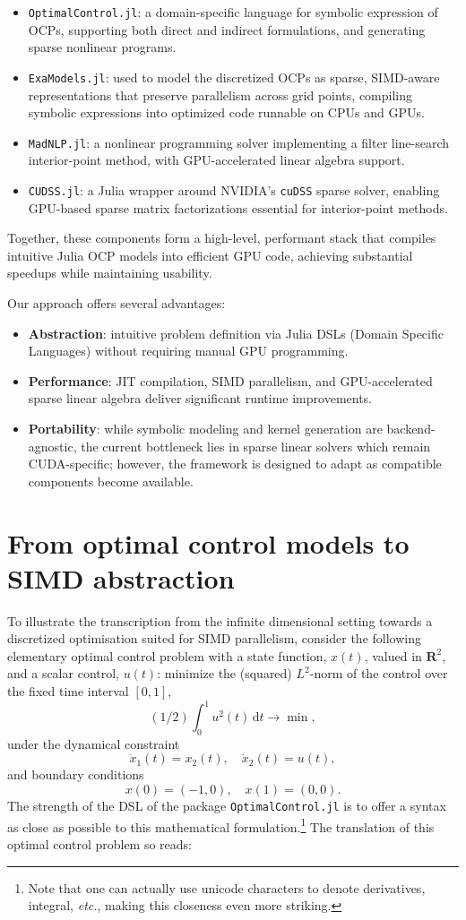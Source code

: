 \begin{itemize}
    \item \texttt{OptimalControl.jl}: a domain-specific language for symbolic expression of OCPs, supporting both direct and indirect formulations, and generating sparse nonlinear programs.
    \item \texttt{ExaModels.jl}: used to model the discretized OCPs as sparse, 
    SIMD-aware representations that preserve parallelism across grid points, compiling symbolic expressions into optimized code runnable on CPUs and GPUs.
    \item \texttt{MadNLP.jl}: a nonlinear programming solver implementing a filter line-search interior-point method, with GPU-accelerated linear algebra support.
    \item \texttt{CUDSS.jl}: a Julia wrapper around NVIDIA’s \texttt{cuDSS} sparse solver, enabling GPU-based sparse matrix factorizations essential for interior-point methods.
\end{itemize}
\noindent Together, these components form a high-level, performant stack that compiles intuitive Julia OCP models into efficient GPU code, achieving substantial speedups while maintaining usability.

Our approach offers several advantages:
\begin{itemize}
    \item \textbf{Abstraction}: intuitive problem definition via Julia DSLs (Domain Specific Languages) without requiring manual GPU programming.
    \item \textbf{Performance}: JIT compilation, SIMD parallelism, and GPU-accelerated sparse linear algebra deliver significant runtime improvements.
    \item \textbf{Portability}: while symbolic modeling and kernel generation are backend-agnostic, the current bottleneck lies in sparse linear solvers which remain CUDA-specific; however, the framework is designed to adapt as compatible components become available.
\end{itemize}

\section{From optimal control models to SIMD abstraction}
To illustrate the transcription from the infinite dimensional setting towards a discretized optimisation suited for SIMD parallelism, consider the following elementary optimal control problem with a state function, $x(t)$, valued in $\mathbf{R}^2$, and a scalar control, $u(t)$: minimize the (squared) $L^2$-norm of the control over the fixed time interval $[0,1]$,
$$ (1/2) \int_0^1 u^2(t)\,\mathrm{d}t \to \min, $$
under the dynamical constraint
$$ \dot{x}_1(t) = x_2(t),\quad \dot{x}_2(t) = u(t), $$
and boundary conditions
$$ x(0) = (-1, 0),\quad x(1) = (0,0). $$
The strength of the DSL of the package \texttt{OptimalControl.jl} is to offer a syntax as close as possible to this mathematical formulation.\footnote{Note that one can actually use unicode characters to denote derivatives, integral, \emph{etc.}, making this closeness even more striking.} The translation of this optimal control problem so reads:

